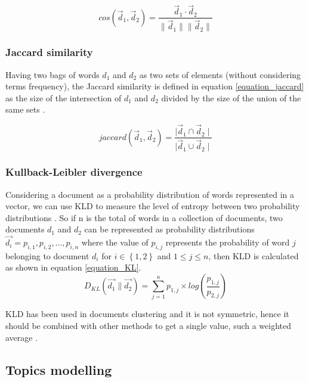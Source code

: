 \documentclass[preprint,12pt,3p]{elsarticle}
\begin{document}
\begin{equation}
\label{equation_cosine}
cos(\vec{d}_{1},\vec{d}_{2})=\frac{\vec{d}_{1}\cdot\vec{d}_{2}}{\parallel \vec{d}_{1}\parallel \parallel \vec{d}_{2} \parallel }
\end{equation}

\subsubsection{Jaccard similarity}
Having two bags of words ${d_{1}}$ and ${d_{2}}$ as two sets of elements (without considering terms frequency), the Jaccard similarity is defined in equation \ref{equation_jaccard} as the size of the intersection of ${d_{1}}$ and ${d_{2}}$ divided by the size of the union of the same sets \cite{aggarwal2015data}.

\begin{equation}
\label{equation_jaccard}
jaccard(\vec{d}_{1},\vec{d}_{2}) = \frac{\mid \vec{d}_{1}\cap \vec{d}_{2}\mid}{\mid\vec{d}_{1}\cup \vec{d}_{2}\mid}
\end{equation}

\subsubsection{Kullback-Leibler divergence}

Considering a document as a probability distribution of words represented in a vector, we can use KLD to measure the level of entropy between two probability distributions \cite{kocher2017distance}. So if n is the total of words in a collection of documents, two documents ${d_{1}}$ and ${d_{2}}$ can be represented as probability distributions ${\vec{d_{i}}=p_{i,1}, p_{i,2},…, p_{i,n}}$ where the value of ${p_{i,j}}$ represents the probability of word $j$ belonging to document ${d_{i}}$ for ${i \in \left \{ 1,2 \right \}}$ and ${1 \leq  j \leq  n}$, then KLD is calculated as shown in equation \ref{equation_KL}.
\begin{equation}
\label{equation_KL}
D_{KL}(\vec{d_{1}}\parallel\vec{d_{2}})=\sum_{j=1}^{n}{p_{1,j}\times log(\frac{p_{1,j}}{p_{2,j}})}
\end{equation}

KLD has been used in documents clustering and it is not symmetric, hence it should be combined with other methods to get a single value, such a weighted average \cite{kocher2017distance}.\par

\subsection{Topics modelling}
\end{document}
